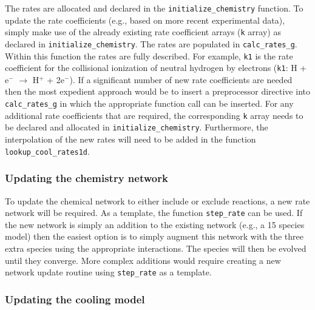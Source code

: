 The rates are allocated and declared in the
\texttt{initialize\_chemistry} function. To update the rate
coefficients (e.g., based on more recent experimental data), simply
make use of the already existing rate coefficient arrays (\texttt{k}
array) as declared in \texttt{initialize\_chemistry}. The rates are
populated in \texttt{calc\_rates\_g}. Within this function the rates
are fully described. For example, \texttt{k1} is the rate coefficient
for the collisional ionization of neutral hydrogen by electrons
(\texttt{k1}: H + e$^{-}$ $\rightarrow$ H$^{+}$ + 2e$^{-}$). If a
significant number of new rate coefficients are needed then the most
expedient approach would be to insert a preprocessor directive into
\texttt{calc\_rates\_g} in which the appropriate function call can be
inserted.  For any additional rate coefficients that are required, the
corresponding \texttt{k} array needs to be declared and allocated in
\texttt{initialize\_chemistry}.  Furthermore, the interpolation of the
new rates will need to be added in the function
\texttt{lookup\_cool\_rates1d}.


\subsubsection{Updating the chemistry network}

To update the chemical network to either include or exclude reactions,
a new rate network will be required. As a template, the function
\texttt{step\_rate} can be used.  If the new network is simply an
addition to the existing network (e.g., a 15 species model) then the
easiest option is to simply augment this network with the three extra
species using the appropriate interactions. The species will then be
evolved until they converge. More complex additions would require
creating a new network update routine using \texttt{step\_rate}
as a template.

\subsubsection{Updating the cooling model}

